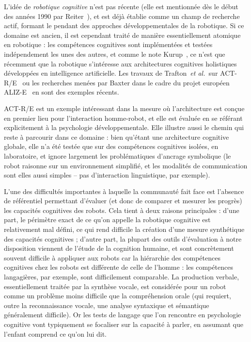 \documentclass[a4paper]{article}
\newcommand{\etal}{{\textit{et al.~}}}
\begin{document}
L'idée de \emph{robotique cognitive} n'est pas récente (elle est mentionnée dès
le début des années 1990 par Reiter~\cite{Levesque2008}), et est déjà établie
comme un champ de recherche actif, formant le pendant des approches
développementales de la robotique. Si ce domaine est ancien, il est cependant
traité de manière essentiellement atomique en robotique : les compétences
cognitives sont implémentées et testées indépendement les unes des autres, et
comme le note Kurup~\cite{kurup2012what}, ce n'est que récemment que la
robotique s'intéresse aux architectures cognitives holistiques développées en
intelligence artificielle. Les travaux de Trafton~\etal sur
ACT-R/E~\cite{trafton2013act} ou les recherches menées par Baxter dans le cadre
du projet européen ALIZ-E~\cite{baxter2013cognitive} en sont des exemples
récents.

ACT-R/E est un exemple intéressant dans la mesure où l'architecture est conçue
en premier lieu pour l'interaction homme-robot, et elle est évaluée en se
référant explicitement à la psychologie développementale. Elle illustre aussi le
chemin qui reste à parcourir dans ce domaine : bien qu'étant une architecture
cognitive globale, elle n'a été testée que sur des compétences cognitives
isolées, en laboratoire, et ignore largement les problématiques d'ancrage
symbolique (le robot raisonne sur un environnement simplifié, et les modalités
de communication sont elles aussi simples -- pas d'interaction linguistique, par
exemple).



L'une des difficultés importantes à laquelle la communauté fait face est
l'absence de référentiel permettant d'évaluer (et donc de comparer et mesurer
les progrès) les capacités cognitives des robots.  Cela tient à deux raisons
principales : d'une part, le périmètre exact de ce qu'on appelle la robotique
cognitive est relativement mal défini, ce qui rend difficile la création d'une
mesure synthétique des capacités cognitives ; d'autre part, la plupart des
outils d'évaluation à notre disposition viennent de l'étude de la cognition
humaine, et sont concrètement souvent difficile à appliquer aux robots car la
hiérarchie des compétences cognitives chez les robots est différente de celle de
l'homme : les compétences langagières, par exemple, sont difficilement
comparable. La production verbale, essentiellement traitée par la synthèse
vocale, est considérée pour un robot comme un problème moins difficile que la
compréhension orale (qui requiert, outre la reconnaissance vocale, une analyse
syntaxique et sémantique généralement difficile). Or les tests de langage que
l'on rencontre en psychologie cognitive vont typiquement se focaliser sur la
capacité à parler, en assumant que l'enfant comprend ce qu'on lui dit.
\end{document}
